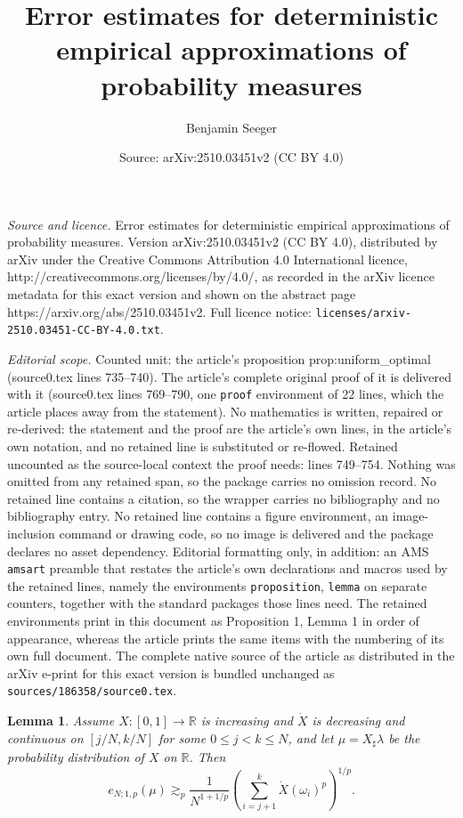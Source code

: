 \documentclass[10pt,a4paper]{amsart}
\title{Error estimates for deterministic empirical approximations of probability measures}
\author{Benjamin Seeger}
\date{Source: arXiv:2510.03451v2 (CC BY 4.0)}
\newtheorem{lemma}{Lemma}
\newcommand{\RR}{{\mathbb R}}
\begin{document}
\maketitle

\noindent\emph{Source and licence.} Error estimates for deterministic empirical approximations of probability measures. Version arXiv:2510.03451v2 (CC BY 4.0), distributed by arXiv under the Creative Commons Attribution 4.0 International licence, http://creativecommons.org/licenses/by/4.0/, as recorded in the arXiv licence metadata for this exact version and shown on the abstract page https://arxiv.org/abs/2510.03451v2. Full licence notice: \texttt{licenses/arxiv-2510.03451-CC-BY-4.0.txt}.\par\smallskip

\noindent\textit{Editorial scope.} Counted unit: the article's proposition prop:uniform\_optimal (source0.tex lines 735--740). The article's complete original proof of it is delivered with it (source0.tex lines 769--790, one \texttt{proof} environment of 22 lines, which the article places away from the statement). No mathematics is written, repaired or re-derived: the statement and the proof are the article's own lines, in the article's own notation, and no retained line is substituted or re-flowed.  Retained uncounted as the source-local context the proof needs: lines 749--754.  Nothing was omitted from any retained span, so the package carries no omission record.  No retained line contains a citation, so the wrapper carries no bibliography and no bibliography entry.  No retained line contains a figure environment, an image-inclusion command or drawing code, so no image is delivered and the package declares no asset dependency.  Editorial formatting only, in addition: an AMS \texttt{amsart} preamble that restates the article's own declarations and macros used by the retained lines, namely the environments \texttt{proposition}, \texttt{lemma} on separate counters, together with the standard packages those lines need.  The retained environments print in this document as Proposition 1, Lemma 1 in order of appearance, whereas the article prints the same items with the numbering of its own full document.  The complete native source of the article as distributed in the arXiv e-print for this exact version is bundled unchanged as \texttt{sources/186358/source0.tex}.
\begin{lemma}\label{lem:increasing:estimate}
	Assume $X: [0,1] \to \RR$ is increasing and $\dot X$ is decreasing and continuous on $[j/N,k/N]$ for some $0 \le j < k \le N$, and let $\mu = X_\sharp \lambda$ be the probability distribution of $X$ on $\RR$. Then
	\[
		e_{N;1,p}(\mu) \gtrsim_p \frac{1}{N^{1+1/p}} \left( \sum_{i=j+1}^k \dot X(\omega_i)^p \right)^{1/p}.
	\]
\end{lemma}
\end{document}
